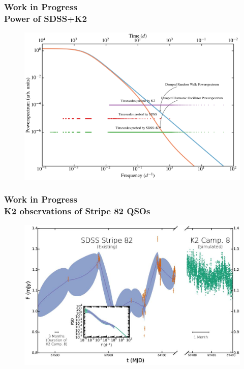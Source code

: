 \documentclass[hyperref={pdfpagelabels=false}]{beamer}
\begin{document}
\begin{frame}
\frametitle{Work in Progress\\Power of SDSS+K2}
        \begin{figure}
          \includegraphics[scale=0.065]{images/PowerOfSDSSK2.jpg}
        \end{figure}
\end{frame}

\begin{frame}
\frametitle{Work in Progress\\K2 observations of Stripe 82 QSOs}
        \begin{figure}
          \includegraphics[scale=0.3]{images/LC_2.jpg}
        \end{figure}
\end{frame}
\end{document}
